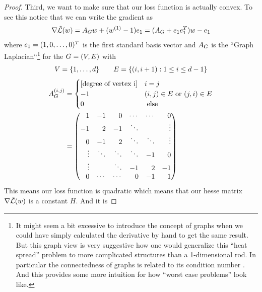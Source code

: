 \begin{proof}
	Third, we want to make sure that our loss function is actually convex. To
	see this notice that we can write the gradient as
	\begin{align}\label{eq: naive complexity example loss gradient}
		\nabla \tilde{\mathcal{L}}(w)
		= A_Gw + (w^{(1)} -1) e_1
		= (A_G + e_1 e_1^T)w - e_1
	\end{align}
	where \(e_1=(1,0,\dots,0)^T\) is the first standard basis
	vector and \(A_G\) is the ``Graph Laplacian``\footnote{
		It might seem a bit excessive to introduce the concept of graphs when
		we could have simply calculated the derivative by hand to get the same
		result. But this graph view is very suggestive how one would generalize
		this ``heat spread'' problem to more complicated structures than a
		1-dimensional rod. In particular the connectedness of graphs is related
		to its condition number \parencite{gohWhyMomentumReally2017}. And this
		provides some more intuition for how ``worst case problems'' look like.
	} for the 
	 \(G=(V, E)\) with 
	\begin{align*}
		V = \{1,\dots, d\}
		\qquad
		E = \{(i, i+1) : 1\le i \le d-1\}
	\end{align*}
	\begin{align*}
		\graphLaplacian^{(i,j)} 
		&= 
		\begin{cases}
			[\text{degree of vertex i}] & i=j\\
			-1 & (i,j)\in\edges \text{ or } (j,i)\in\edges\\
			0 & \text{ else}
		\end{cases}
		\\
		&=
		\begin{pmatrix*}[r]
			1 & -1 & 0  & \cdots & \cdots & 0 \\
			-1 & 2 & -1 & \ddots &  &  \vdots \\ 
			0 & -1 & 2 & \ddots & \ddots & \vdots \\
			\vdots & \ddots & \ddots & \ddots & -1 & 0 \\
			\vdots &  & \ddots & -1 & 2 & -1 \\
			0 & \cdots & \cdots & 0  & -1 & 1
		\end{pmatrix*}
	\end{align*}
	This means our loss function is quadratic which means that our
	hesse matrix \(\nabla \tilde{\mathcal{L}}(w)\) is a constant \(H\). And it is

\end{proof}
